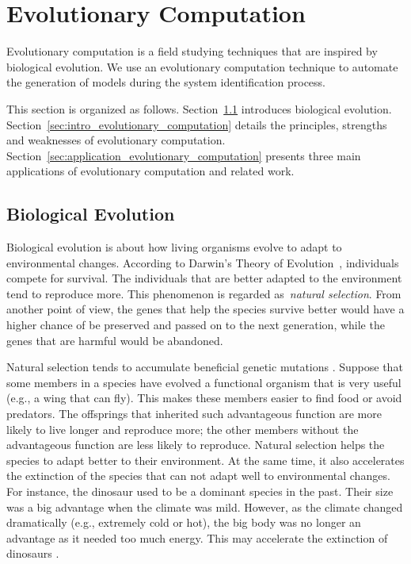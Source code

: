 \section{Evolutionary Computation}\label{sec:evolutionary_computation}

Evolutionary computation is a field studying techniques that are inspired by biological evolution. We use an evolutionary computation technique to automate the generation of models during the system identification process. 

This section is organized as follows. Section~\ref{sec:natural_evolution} introduces biological evolution. Section~\ref{sec:intro_evolutionary_computation} details the principles, strengths and weaknesses of evolutionary computation. Section~\ref{sec:application_evolutionary_computation} presents three main applications of evolutionary computation and related work.

\subsection{Biological Evolution}\label{sec:natural_evolution}

Biological evolution is about how living organisms evolve to adapt to environmental changes. According to Darwin's Theory of Evolution~\cite{Darwin_1859}, individuals compete for survival. The individuals that are better adapted to the environment tend to reproduce more. This phenomenon is regarded as~\textit{natural selection}. From another point of view, the genes that help the species survive better would have a higher chance of be preserved and passed on to the next generation, while the genes that are harmful would be abandoned. 

Natural selection tends to accumulate beneficial genetic mutations \cite{Desai2007}. Suppose that some members in a species have evolved a functional organism that is very useful (e.g., a wing that can fly). This makes these members easier to find food or avoid predators. The offsprings that inherited such advantageous function are more likely to live longer and reproduce more; the other members without the advantageous function are less likely to reproduce. Natural selection helps the species to adapt better to their environment. At the same time, it also accelerates the extinction of the species that can not adapt well to environmental changes. For instance, the dinosaur used to be a dominant species in the past. Their size was a big advantage when the climate was mild. However, as the climate changed dramatically (e.g., extremely cold or hot), the big body was no longer an advantage as it needed too much energy. This may accelerate the extinction of dinosaurs \cite{Russell1965}. 

